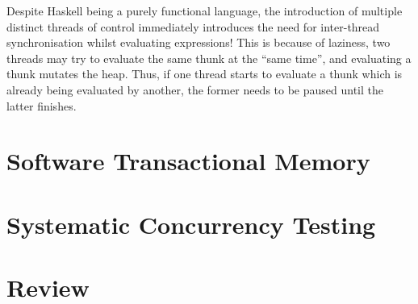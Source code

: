 
Despite Haskell being a purely functional language, the introduction
of multiple distinct threads of control immediately introduces the
need for inter-thread synchronisation whilst evaluating
expressions\cite{concurrent}! This is because of laziness, two threads
may try to evaluate the same thunk at the ``same time'', and
evaluating a thunk mutates the heap. Thus, if one thread starts to
evaluate a thunk which is already being evaluated by another, the
former needs to be paused until the latter finishes.

\section{Software Transactional Memory}
\label{sec:litrev-stm}

\section{Systematic Concurrency Testing}
\label{sec:litrev-sct}


\section{Review}
\label{sec:litrev-review}

